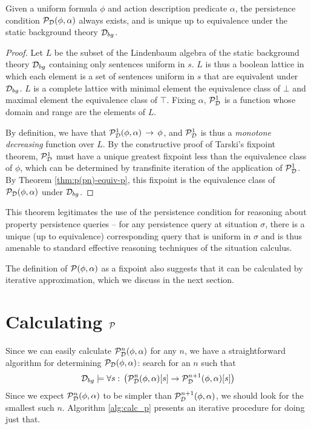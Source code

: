\begin{thm}
Given a uniform formula $\phi$ and action description predicate $\alpha$,
the persistence condition $\mathcal{P}_{\mathcal{D}}(\phi,\alpha)$ always exists,
and is unique up to equivalence under the static background theory
$\mathcal{D}_{bg}$. \label{thm:p-always-exists} 
\end{thm}
\begin{proof}
Let $L$ be the subset of the Lindenbaum algebra of the static background
theory $\mathcal{D}_{bg}$ containing only sentences uniform in $s$. $L$
is thus a boolean lattice in which each element is a set of sentences
uniform in $s$ that are equivalent under $\mathcal{D}_{bg}$. $L$ is a complete
lattice with minimal element the equivalence class of $\bot$ and
maximal element the equivalence class of $\top$. Fixing $\alpha$,
$\mathcal{P}^{1}_{\mathcal{D}}$ is a function whose domain and range are the elements of
$L$.

By definition, we have that $\mathcal{P}^{1}_{\mathcal{D}}(\phi,\alpha)\,\rightarrow\,\phi$,
and $\mathcal{P}^{1}_{\mathcal{D}}$ is thus a \emph{monotone decreasing} function over $L$.
By the constructive proof of Tarski's fixpoint theorem, $\mathcal{P}^{1}_{\mathcal{D}}$
must have a unique greatest fixpoint less than the equivalence class
of $\phi$, which can be determined by transfinite iteration of the
application of $\mathcal{P}^{1}_{\mathcal{D}}$. By Theorem \ref{thm:p(pn)-equiv-p}, this
fixpoint is the equivalence class of $\mathcal{P}_{\mathcal{D}}(\phi,\alpha)$ under
$\mathcal{D}_{bg}$. 
\end{proof}
This theorem legitimates the use of the persistence condition for
reasoning about property persistence queries -- for any persistence
query at situation $\sigma$, there is a unique (up to equivalence)
corresponding query that is uniform in $\sigma$ and is thus amenable
to standard effective reasoning techniques of the situation calculus.

The definition of $\mathcal{P}(\phi,\alpha)$ as a fixpoint also suggests
that it can be calculated by iterative approximation, which we discuss
in the next section.


\section{Calculating $\mathcal{P}$\label{sec:Persistence:Calculating}}

Since we can easily calculate $\mathcal{P}_{\mathcal{D}}^{n}(\phi,\alpha)$
for any $n$, we have a straightforward algorithm for determining
$\mathcal{P}_{\mathcal{D}}(\phi,\alpha)$: search for an $n$ such that\[
\mathcal{D}_{bg}\models\forall s:\,\left(\mathcal{P}_{\mathcal{D}}^{n}(\phi,\alpha)[s]\rightarrow\mathcal{P}_{\mathcal{D}}^{n+1}(\phi,\alpha)[s]\right)\]
 Since we expect $\mathcal{P}_{\mathcal{D}}^{n}(\phi,\alpha)$ to
be simpler than $\mathcal{P}_{\mathcal{D}}^{n+1}(\phi,\alpha)$, we
should look for the smallest such $n$. Algorithm \ref{alg:calc_p}
presents an iterative procedure for doing just that.

